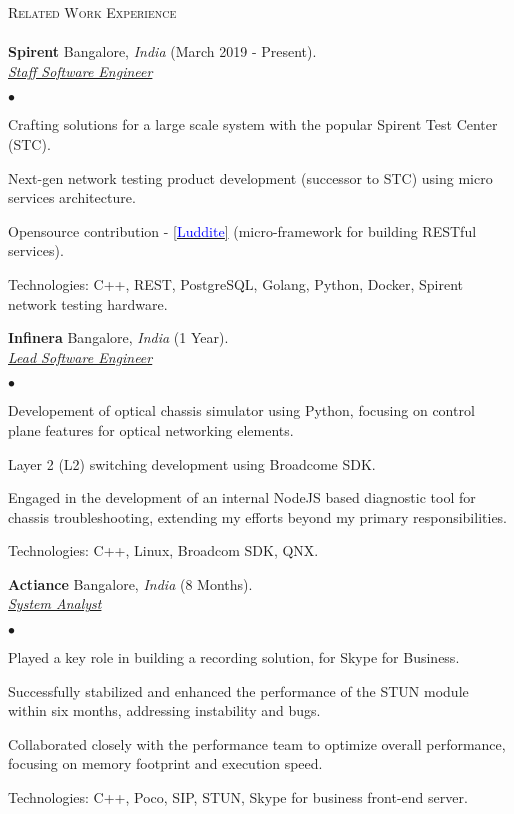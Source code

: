 \documentclass[a4paper]{article}
\newcommand{\lineunder}{\vspace*{-8pt} \\ \hspace*{-18pt} \hrulefill \\}
\newcommand{\header}[1]{{\hspace*{-15pt}\vspace*{6pt} \textsc{#1}} \vspace*{-6pt} \lineunder}
\newcommand{\employer}[4]{{ \textbf{#1} #2  (#3).\\ \underline{\emph{#4}}\\  }}
\newenvironment{achievements}{\begin{list}{$\bullet$}{\topsep 0pt \itemsep -2pt}}{\vspace*{4pt}\end{list}}
\begin{document}
\header{Related Work Experience}
\employer{Spirent} {Bangalore, \textit{India}} {March 2019 - Present} {Staff Software Engineer}
	\begin{achievements}
		  \item Crafting solutions for a large scale system with the popular Spirent Test Center (STC).
          \item Next-gen network testing product development (successor to STC) using micro services architecture. 
          \item Opensource contribution - \href{https://github.com/SpirentOrion/luddite.v2}{[{\underline{\textcolor{blue}{Luddite}}}]} (micro-framework for building RESTful services).
          \item Technologies: C++, REST, PostgreSQL, Golang, Python, Docker, Spirent network testing hardware.
	\end{achievements}
\employer{Infinera} {Bangalore, \textit{India}} {1 Year} {Lead Software Engineer}
	\begin{achievements}
		  \item Developement of optical chassis simulator using Python, focusing on control plane features for optical networking elements.
		  \item Layer 2 (L2) switching development using Broadcome SDK.
		  \item Engaged in the development of an internal NodeJS based diagnostic tool for chassis troubleshooting, extending my efforts beyond my primary responsibilities.
          \item Technologies: C++, Linux, Broadcom SDK, QNX.
	\end{achievements}

\employer{Actiance} {Bangalore, \textit{India}} {8 Months} {System Analyst}
	\begin{achievements}
		  \item Played a key role in building a recording solution, for Skype for Business. 
		  \item Successfully stabilized and enhanced the performance of the STUN module within six months, addressing instability and bugs.
		  \item Collaborated closely with the performance team to optimize overall performance, focusing on memory footprint and execution speed.
          \item Technologies: C++, Poco, SIP, STUN, Skype for business front-end server.
	\end{achievements}
\end{document}
